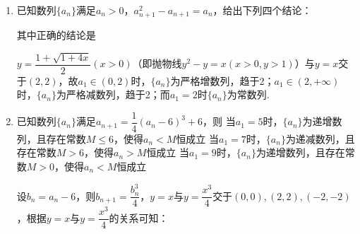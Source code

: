 \begin{enumerate}
\begin{enumerate}
        \begin{jieda}
        \end{jieda}
        \item 已知数列$\{a_n\}$满足$a_n > 0$，$a_{n+1}^2 - a_{n+1} = a_n$，给出下列四个结论：
        其中正确的结论是
        \begin{jieda}
            $y = \dfrac{1+\sqrt{1+4x}}{2} (x > 0)$（即抛物线$y^2 - y = x (x> 0, y > 1)$）与$y = x$交于$(2, 2)$，故$a_1 \in (0, 2)$时，$\{a_n\}$为严格增数列，趋于2；$a_1 \in (2, +\infty)$时，$\{a_n\}$为严格减数列，趋于2；而$a_1 = 2$时$\{a_n\}$为常数列.
        \end{jieda}
        \item 已知数列$\{a_n\}$满足$a_{n+1} = \dfrac{1}{4}(a_n - 6)^3 + 6$，则
        {当$a_1 = 5$时，$\{a_n\}$为递增数列，且存在常数$M \leq 6$，使得$a_n < M$恒成立}
        {当$a_1 = 7$时，$\{a_n\}$为递减数列，且存在常数$M > 6$，使得$a_n > M$恒成立}
        {当$a_1 = 9$时，$\{a_n\}$为递增数列，且存在常数$M > 0$，使得$a_n < M$恒成立}
        \begin{jieda}
            设$b_n = a_n - 6$，则$b_{n+1} = \dfrac{b_n^3}{4}$，$y = x$与$y = \dfrac{x^3}{4}$交于$(0,0),(2, 2), (-2, -2)$，根据$y = x$与$y = \dfrac{x^3}{4}$的关系可知：

\end{jieda}
\end{enumerate}
\end{enumerate}
